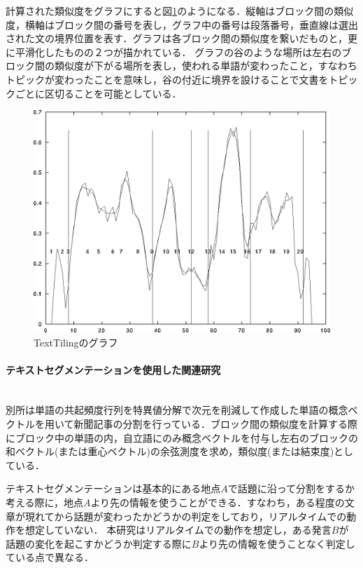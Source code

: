 計算された類似度をグラフにすると図\ref{Fig:textTilingGraph}のようになる．縦軸はブロック間の類似度，横軸はブロック間の番号を表し，グラフ中の番号は段落番号，垂直線は選出された文の境界位置を表す．グラフは各ブロック間の類似度を繋いだものと，更に平滑化したものの２つが描かれている．
グラフの谷のような場所は左右のブロック間の類似度が下がる場所を表し，使われる単語が変わったこと，すなわちトピックが変わったことを意味し，谷の付近に境界を設けることで文書をトピックごとに区切ることを可能としている．
\begin{figure}[htbp]
 \begin{center}
  \includegraphics[width=\textwidth]{../images/2.Related_Work/textTiling-graph.png}
  \caption{TextTilingのグラフ}
  \label{Fig:textTilingGraph}
  \vspace{-10pt}
 \end{center}
\end{figure}

\paragraph{テキストセグメンテーションを使用した関連研究}\ \\
別所\cite{textSegmentation1}は単語の共起頻度行列を特異値分解で次元を削減して作成した単語の概念ベクトルを用いて新聞記事の分割を行っている．ブロック間の類似度を計算する際にブロック中の単語の内，自立語にのみ概念ベクトルを付与し左右のブロックの和ベクトル(または重心ベクトル)の余弦測度を求め，類似度(または結束度)としている．

テキストセグメンテーションは基本的にある地点$A$で話題に沿って分割をするか考える際に，地点$A$より先の情報を使うことができる．すなわち，ある程度の文章が現れてから話題が変わったかどうかの判定をしており，リアルタイムでの動作を想定していない．
本研究はリアルタイムでの動作を想定し，ある発言$B$が話題の変化を起こすかどうか判定する際に$B$より先の情報を使うことなく判定している点で異なる．
%
